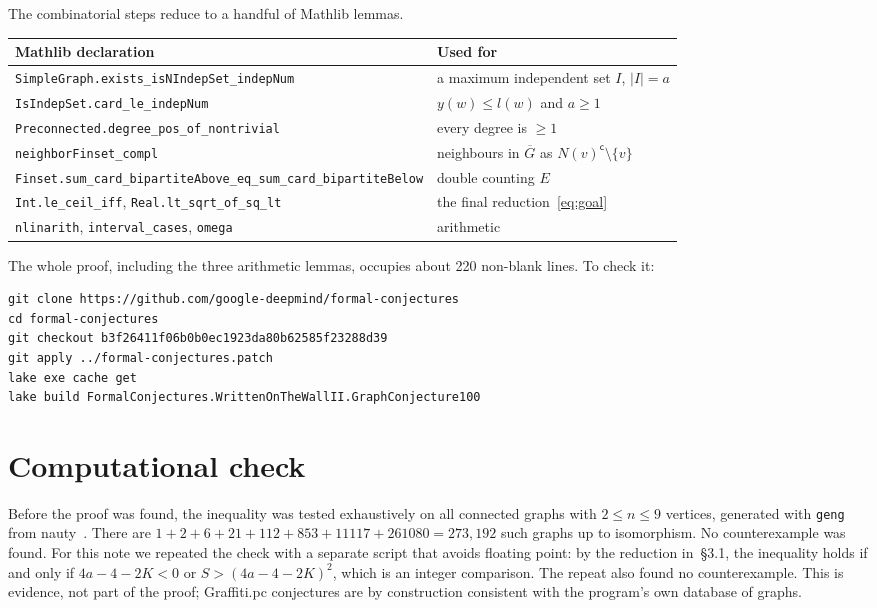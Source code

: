 \documentclass[11pt]{article}
\theoremstyle{definition}
\theoremstyle{remark}
\newcommand{\Gbar}{\overline{G}}
\begin{document}
The combinatorial steps reduce to a handful of Mathlib lemmas.
\begin{center}
\small
\begin{tabular}{p{}p{}}
\toprule
Mathlib declaration & Used for \\
\midrule
\texttt{SimpleGraph.exists\_isNIndepSet\_indepNum} & a maximum independent set $I$, $|I| = a$ \\
\texttt{IsIndepSet.card\_le\_indepNum} & $y(w) \le l(w)$ and $a \ge 1$ \\
\texttt{Preconnected.degree\_pos\_of\_nontrivial} & every degree is $\ge 1$ \\
\texttt{neighborFinset\_compl} & neighbours in $\Gbar$ as $N(v)^{\mathsf c} \setminus \{v\}$ \\
\texttt{Finset.sum\_card\_bipartiteAbove\_eq\_\allowbreak sum\_card\_bipartiteBelow} & double counting $E$ \\
\texttt{Int.le\_ceil\_iff}, \texttt{Real.lt\_sqrt\_of\_sq\_lt} & the final reduction~\eqref{eq:goal} \\
\texttt{nlinarith}, \texttt{interval\_cases}, \texttt{omega} & arithmetic \\
\bottomrule
\end{tabular}
\end{center}

\noindent
The whole proof, including the three arithmetic lemmas, occupies about 220
non-blank lines. To check it:
\begin{Verbatim}
git clone https://github.com/google-deepmind/formal-conjectures
cd formal-conjectures
git checkout b3f26411f06b0b0ec1923da80b62585f23288d39
git apply ../formal-conjectures.patch
lake exe cache get
lake build FormalConjectures.WrittenOnTheWallII.GraphConjecture100
\end{Verbatim}

\section{Computational check}

Before the proof was found, the inequality was tested exhaustively on all
connected graphs with $2 \le n \le 9$ vertices, generated with
\texttt{geng} from nauty~\cite{nauty}. There are
$1 + 2 + 6 + 21 + 112 + 853 + 11117 + 261080 = 273{,}192$ such graphs up to
isomorphism. No counterexample was found. For this note we repeated the check
with a separate script that avoids floating point: by the reduction
in~\S3.1, the inequality holds if and only if $4a - 4 - 2K < 0$ or
$S > (4a-4-2K)^2$, which is an integer comparison. The repeat also found no
counterexample. This is evidence, not part of the proof; Graffiti.pc
conjectures are by construction consistent with the program's own database
of graphs.
\end{document}
